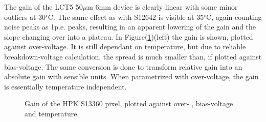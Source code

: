 \documentclass[article,type=msc,colorback,accentcolor=tud9c]{tudthesis}
\begin{document}
The gain of the LCT5 50$\mu$m 6mm device is clearly linear with some minor outliers at 30$^{\circ}$C.  The same effect as with S12642 is visible at 35$^{\circ}$C, again counting noise peaks as 1p.e. peaks, resulting in an apparent lowering of the gain and the slope changing over into a plateau. In Figure(\ref{fig:S13360_Gain})(left) the gain is shown, plotted against over-voltage. It is still dependant on temperature, but due to reliable breakdown-voltage calculation, the spread is much smaller than, if plotted against bias-voltage. The same conversion is done to transform relative gain into an absolute gain with sensible units. When parametrized with over-voltage, the gain is essentially temperature independent.
\begin{figure}[h]
\begin{centering}
\caption{Gain of the HPK S13360 pixel, plotted against over- , bias-voltage and temperature. }
\label{fig:S13360_Gain}
\end{centering}
\end{figure}


\newpage
\end{document}
